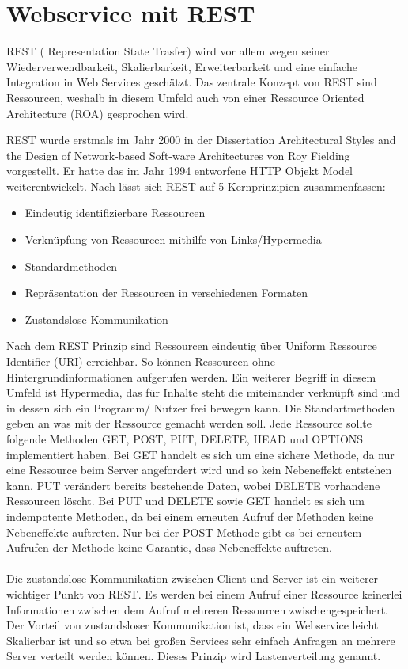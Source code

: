 \section{Webservice mit REST}
\label{GrundlagenREST}
\ac{REST} ( Representation State Trasfer) wird vor allem wegen seiner Wiederverwendbarkeit, Skalierbarkeit, Erweiterbarkeit und eine einfache Integration in Web Services geschätzt. Das zentrale Konzept von REST sind Ressourcen, weshalb in diesem Umfeld auch von einer Ressource Oriented Architecture (\ac{ROA}) gesprochen wird.


\ac{REST} wurde erstmals im Jahr 2000 in der Dissertation Architectural Styles and the Design of Network-based Soft-ware Architectures von Roy Fielding vorgestellt. Er hatte das im Jahr 1994 entworfene \ac{HTTP} Objekt Model weiterentwickelt.
Nach \cite{tilkov2011rest} lässt sich \ac{REST} auf 5 Kernprinzipien zusammenfassen:

\begin{itemize}
	\item Eindeutig identifizierbare Ressourcen
	\item Verknüpfung von Ressourcen mithilfe von Links/Hypermedia
	\item Standardmethoden
	\item Repräsentation der Ressourcen in verschiedenen Formaten
	\item Zustandslose Kommunikation
\end{itemize}

Nach dem \ac{REST} Prinzip sind Ressourcen eindeutig über Uniform Ressource Identifier (\ac{URI}) erreichbar. So können Ressourcen ohne Hintergrundinformationen aufgerufen werden. Ein weiterer Begriff in diesem Umfeld ist Hypermedia, das für Inhalte steht die miteinander verknüpft sind und in dessen sich ein Programm/ Nutzer frei bewegen kann. 
Die Standartmethoden geben an was mit der Ressource gemacht werden soll. Jede Ressource sollte folgende Methoden GET, POST, PUT, DELETE, HEAD und OPTIONS implementiert haben. Bei GET handelt es sich um eine sichere Methode, da nur eine Ressource beim Server angefordert wird und so kein Nebeneffekt entstehen kann. PUT verändert bereits bestehende Daten, wobei DELETE vorhandene Ressourcen löscht. Bei PUT und DELETE sowie GET handelt es sich um indempotente Methoden, da bei einem erneuten Aufruf der Methoden keine Nebeneffekte auftreten. Nur bei der POST-Methode gibt es bei erneutem Aufrufen der Methode keine Garantie, dass Nebeneffekte auftreten.
\paragraph{}
Die zustandslose Kommunikation zwischen Client und Server ist ein weiterer wichtiger Punkt von \ac{REST}. Es werden bei einem Aufruf einer Ressource keinerlei Informationen zwischen dem Aufruf mehreren Ressourcen zwischengespeichert. Der Vorteil von zustandsloser Kommunikation ist, dass ein Webservice leicht Skalierbar ist und so etwa bei großen Services sehr einfach Anfragen an mehrere Server verteilt werden können. Dieses Prinzip wird Lastenverteilung genannt.
